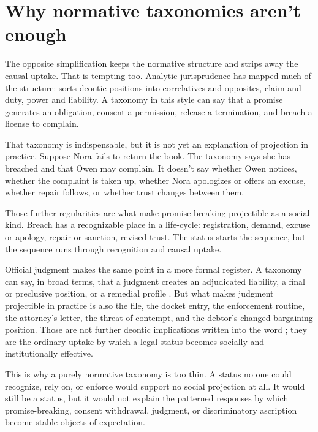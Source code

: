 \documentclass[12pt]{article}
\begin{document}
\section{Why normative taxonomies aren't enough}
\label{sec:normative-not-enough}

The opposite simplification keeps the normative structure and strips away the causal uptake. That is tempting too. Analytic jurisprudence has mapped much of the structure: \textcite{hohfeld1913SomeFundamental} sorts deontic positions into correlatives and opposites, claim and duty, power and liability. A taxonomy in this style can say that a promise generates an obligation, consent a permission, release a termination, and breach a license to complain.

That taxonomy is indispensable, but it is not yet an explanation of projection in practice. Suppose Nora fails to return the book. The taxonomy says she has breached and that Owen may complain. It doesn't say whether Owen notices, whether the complaint is taken up, whether Nora apologizes or offers an excuse, whether repair follows, or whether trust changes between them.

Those further regularities are what make promise-breaking projectible as a social kind. Breach has a recognizable place in a life-cycle: registration, demand, excuse or apology, repair or sanction, revised trust. The status starts the sequence, but the sequence runs through recognition and causal uptake.

Official judgment makes the same point in a more formal register. A taxonomy can say, in broad terms, that a judgment creates an adjudicated liability, a final or preclusive position, or a remedial profile \citep{americanLawInstitute1982RestatementJudgments}. But what makes judgment projectible in practice is also the file, the docket entry, the enforcement routine, the attorney's letter, the threat of contempt, and the debtor's changed bargaining position. Those are not further deontic implications written into the word ; they are the ordinary uptake by which a legal status becomes socially and institutionally effective.

This is why a purely normative taxonomy is too thin. A status no one could recognize, rely on, or enforce would support no social projection at all. It would still be a status, but it would not explain the patterned responses by which promise-breaking, consent withdrawal, judgment, or discriminatory ascription become stable objects of expectation.
\end{document}
